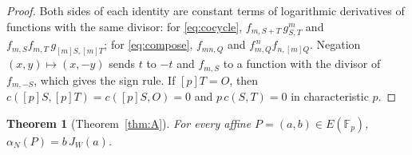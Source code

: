 \documentclass[11pt,a4paper]{article}
\numberwithin{equation}{section}
\theoremstyle{plain}
\newtheorem{theorem}{Theorem}[section]
\theoremstyle{definition}
\newcommand{\F}{\mathbb{F}}
\begin{document}
\begin{proof}
Both sides of each identity are constant terms of logarithmic derivatives of functions with the same divisor: for \eqref{eq:cocycle}, $f_{m,S+T}\,g_{S,T}^m$ and $f_{m,S}f_{m,T}\,g_{[m]S,[m]T}$; for \eqref{eq:compose}, $f_{mn,Q}$ and $f_{m,Q}^{\,n}f_{n,[m]Q}$. Negation $(x,y)\mapsto(x,-y)$ sends $t$ to $-t$ and $f_{m,S}$ to a function with the divisor of $f_{m,-S}$, which gives the sign rule. If $[p]T=O$, then $c([p]S,[p]T)=c([p]S,O)=0$ and $p\,c(S,T)=0$ in characteristic $p$.
\end{proof}

\begin{theorem}[Theorem~\ref{thm:A}]\label{thm:order}
For every affine $P=(a,b)\in E(\F_p)$, $\alpha_N(P)=b\,J_W(a)$.
\end{theorem}
\end{document}
